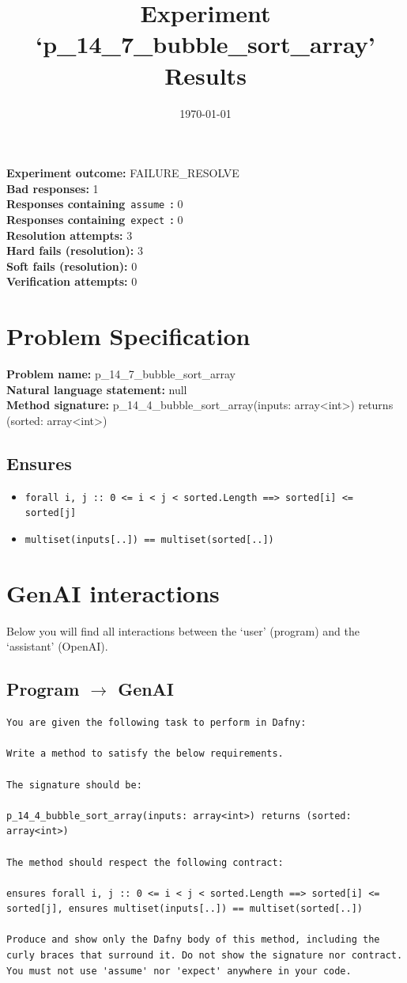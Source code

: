 \documentclass{article}
\begin{document}
\title{Experiment `p\_14\_7\_bubble\_sort\_array' Results}
\author{\today}
\date{}
\maketitle
\textbf{Experiment outcome: }FAILURE\_RESOLVE
\\\textbf{Bad responses: }1
\\\textbf{Responses containing}~\texttt{assume}~\textbf{: }0
\\\textbf{Responses containing}~\texttt{expect}~\textbf{: }0
\\\textbf{Resolution attempts: }3
\\\textbf{Hard fails (resolution): }3
\\\textbf{Soft fails (resolution): }0
\\\textbf{Verification attempts: }0
\section*{Problem Specification}
\textbf{Problem name: }p\_14\_7\_bubble\_sort\_array
\\\textbf{Natural language statement: }null
\\\textbf{Method signature: }p\_14\_4\_bubble\_sort\_array(inputs: array<int>) returns (sorted: array<int>)
\subsection*{Ensures}
\begin{itemize}
\item \texttt{forall i, j :: 0 <= i < j < sorted.Length ==> sorted[i] <= sorted[j]}
\item \texttt{multiset(inputs[..]) == multiset(sorted[..])}
\end{itemize}
\clearpage
\section*{GenAI interactions}
Below you will find all interactions between the `user' (program) and the `assistant' (OpenAI).
\subsection*{Program $\rightarrow$ GenAI}
\begin{lstlisting}
You are given the following task to perform in Dafny:

Write a method to satisfy the below requirements.

The signature should be:

p_14_4_bubble_sort_array(inputs: array<int>) returns (sorted: array<int>)

The method should respect the following contract:

ensures forall i, j :: 0 <= i < j < sorted.Length ==> sorted[i] <= sorted[j], ensures multiset(inputs[..]) == multiset(sorted[..])

Produce and show only the Dafny body of this method, including the curly braces that surround it. Do not show the signature nor contract. You must not use 'assume' nor 'expect' anywhere in your code.
\end{lstlisting}
\end{document}
